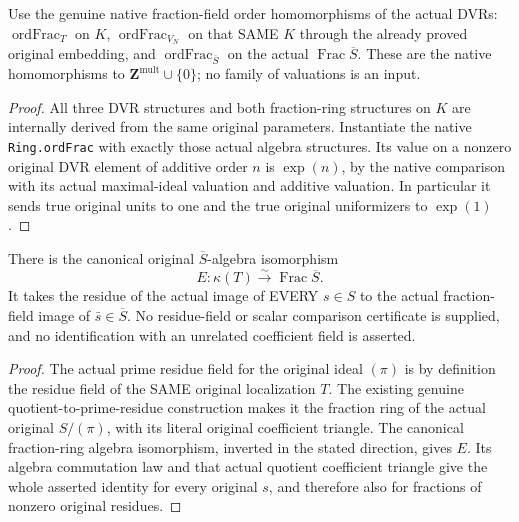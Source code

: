 \begin{definition}
\label{def:gauss-surface-same-field-native-orders}
\leanok
\leavevmode\par
Use the genuine native fraction-field order homomorphisms of the actual
DVRs: $\operatorname{ordFrac}_T$ on $K$,
$\operatorname{ordFrac}_{V_N}$ on that SAME $K$ through the already proved
original embedding, and $\operatorname{ordFrac}_{\overline S}$ on the actual
$\operatorname{Frac}\overline S$. These are the native homomorphisms to
$\mathbf Z^{\mathrm{mult}}\cup\{0\}$; no family of valuations is an input.
\end{definition}
\begin{proof}
All three DVR structures and both fraction-ring structures on $K$ are
internally derived from the same original parameters. Instantiate the native
\texttt{Ring.ordFrac} with exactly those actual algebra structures. Its value
on a nonzero original DVR element of additive order $n$ is $\exp(n)$, by the
native comparison with its actual maximal-ideal valuation and additive
valuation. In particular it sends true original units to one and the true
original uniformizers to $\exp(1)$.
\end{proof}

\begin{lemma}
\label{lem:gauss-surface-canonical-vertical-leading-field}
\leanok
\leavevmode\par
There is the canonical original $\overline S$-algebra isomorphism
\[
 E:\kappa(T)\xrightarrow{\sim}\operatorname{Frac}\overline S.
\]
It takes the residue of the actual image of EVERY $s\in S$ to the actual
fraction-field image of $\bar s\in\overline S$. No residue-field or scalar
comparison certificate is supplied, and no identification with an unrelated
coefficient field is asserted.
\end{lemma}
\begin{proof}
The actual prime residue field for the original ideal $(\pi)$ is by
definition the residue field of the SAME original localization $T$.
The existing genuine quotient-to-prime-residue construction makes it the
fraction ring of the actual original $S/(\pi)$, with its literal original
coefficient triangle. The canonical fraction-ring algebra isomorphism,
inverted in the stated direction, gives $E$. Its algebra commutation law
and that actual quotient coefficient triangle give the whole asserted
identity for every original $s$, and therefore also for fractions of
nonzero original residues.
\end{proof}

